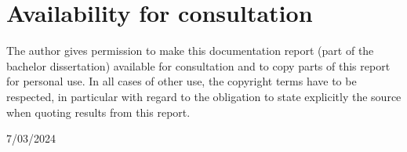 \newpage
\thispagestyle{empty}

\section*{Availability for consultation}

The author gives permission to make this documentation report (part of the bachelor dissertation) available for consultation and to copy parts of this report for personal use. In all cases of other use, the copyright terms have to be respected, in particular with regard to the obligation to state explicitly the source when quoting results from this report.

\hfill 7/03/2024
